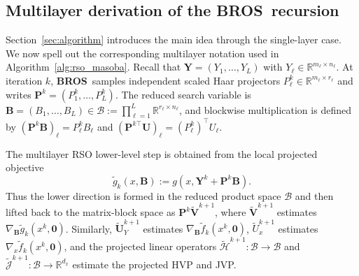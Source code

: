 \documentclass{pkumelon}
\theoremstyle{plain}
\newcommand{\oursname}{\textnormal{\textbf{BROS}}}
\newcommand{\ours}{\oursname\ }
\begin{document}
\subsection{Multilayer derivation of the \ours recursion}
\label{app:multilayer_algorithm_derivation}
\label{app:multilayer_correction}

Section~\ref{sec:algorithm} introduces the main idea through the single-layer case. We now spell out the corresponding multilayer notation used in Algorithm~\ref{alg:rso_masoba}. Recall that $\boldsymbol Y=(Y_1,\ldots,Y_L)$ with $Y_\ell\in\mathbb R^{m_\ell\times n_\ell}$. At iteration $k$, \ours samples independent scaled Haar projectors $P_\ell^k\in\mathbb R^{m_\ell\times r_\ell}$ and writes $\boldsymbol P^k=(P_1^k,\ldots,P_L^k)$. The reduced search variable is $\boldsymbol B=(B_1,\ldots,B_L)\in\mathcal B:=\prod_{\ell=1}^L\mathbb R^{r_\ell\times n_\ell}$, and blockwise multiplication is defined by $(\boldsymbol P^k\boldsymbol B)_\ell=P_\ell^kB_\ell$ and $(\boldsymbol P^{k\top}\boldsymbol U)_\ell=(P_\ell^k)^\top U_\ell$.

The multilayer RSO lower-level step is obtained from the local projected objective
\begin{equation*}
\tilde g_k(x,\boldsymbol B):=g(x,\boldsymbol Y^k+\boldsymbol P^k\boldsymbol B).
\end{equation*}
Thus the lower direction is formed in the reduced product space $\mathcal B$ and then lifted back to the matrix-block space as $\boldsymbol P^k\tilde{\boldsymbol V}^{k+1}$, where $\tilde{\boldsymbol V}^{k+1}$ estimates $\nabla_{\boldsymbol B}\tilde g_k(x^k,\mathbf 0)$. Similarly, $\tilde{\boldsymbol U}_Y^{k+1}$ estimates $\nabla_{\boldsymbol B}\tilde f_k(x^k,\mathbf 0)$, $\tilde U_x^{k+1}$ estimates $\nabla_x\tilde f_k(x^k,\mathbf 0)$, and the projected linear operators $\tilde{\mathcal H}^{k+1}:\mathcal B\to\mathcal B$ and $\tilde{\mathcal J}^{k+1}:\mathcal B\to\mathbb R^{d_x}$ estimate the projected HVP and JVP.
\end{document}
